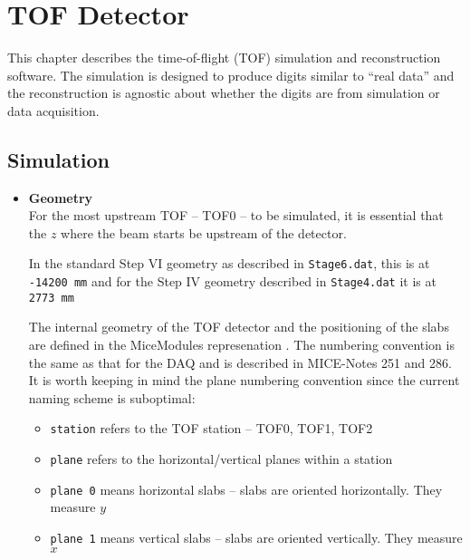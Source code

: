 \chapter{TOF Detector}
\label{chapter:tof}
This chapter describes the time-of-flight (TOF) simulation and reconstruction software. The simulation is designed to produce digits similar to ``real data'' and the reconstruction is agnostic about whether the digits are from simulation or data acquisition.

\section{Simulation}
\begin{itemize}
\item {\bf{Geometry}}\\ 
For the most upstream TOF -- TOF0 -- to be simulated, it is essential that the $z$ where the beam starts be upstream of the detector.
 
In the standard Step VI geometry as described in \verb|Stage6.dat|, this is at \verb|-14200 mm| and for the Step IV geometry described in \verb|Stage4.dat| it is at \verb|2773 mm|

The internal geometry of the TOF detector and the positioning of the slabs are defined in the MiceModules represenation . The numbering convention is the same as that for the DAQ and is described in MICE-Notes 251 and 286. It is worth keeping in mind the plane numbering convention since the current naming scheme is suboptimal:\\
\begin{itemize}
\item \verb|station| refers to the TOF station -- TOF0, TOF1, TOF2
\item \verb|plane| refers to the horizontal/vertical planes within a station
\item \verb|plane 0| means horizontal slabs -- slabs are oriented horizontally. They measure $y$
\item \verb|plane 1| means vertical slabs -- slabs are oriented vertically. They measure $x$
\end{itemize}


\end{itemize}
